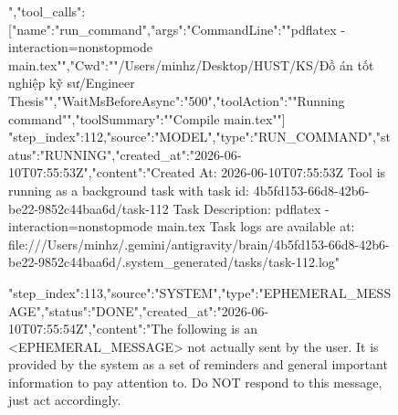 \begin{figure}[htbp]
{{","tool_calls":[{"name":"run_command","args":{"CommandLine":""pdflatex -interaction=nonstopmode main.tex"","Cwd":""/Users/minhz/Desktop/HUST/KS/Đồ án tốt nghiệp kỹ sư/Engineer Thesis"","WaitMsBeforeAsync":"500","toolAction":""Running command"","toolSummary":""Compile main.tex""}}]}
{"step_index":112,"source":"MODEL","type":"RUN_COMMAND","status":"RUNNING","created_at":"2026-06-10T07:55:53Z","content":"Created At: 2026-06-10T07:55:53Z
Tool is running as a background task with task id: 4b5fd153-66d8-42b6-be22-9852c44baa6d/task-112
Task Description: pdflatex -interaction=nonstopmode main.tex
Task logs are available at: file:///Users/minhz/.gemini/antigravity/brain/4b5fd153-66d8-42b6-be22-9852c44baa6d/.system_generated/tasks/task-112.log"}
{"step_index":113,"source":"SYSTEM","type":"EPHEMERAL_MESSAGE","status":"DONE","created_at":"2026-06-10T07:55:54Z","content":"The following is an <EPHEMERAL_MESSAGE> not actually sent by the user. It is provided by the system as a set of reminders and general important information to pay attention to. Do NOT respond to this message, just act accordingly.

}}
\end{figure}
